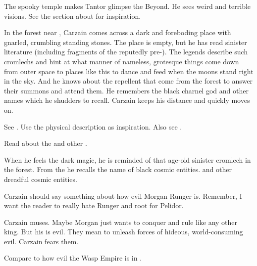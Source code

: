 \begin{changes}
    The spooky temple makes Tantor glimpse the Beyond. 
    He sees weird and terrible visions. 
    See the section about  for inspiration.
  
  
  \begin{comment}
    \paragraph{The Terror of \EreshKal}
  \end{comment}
    In the forest near \Forclin, Carzain comes across a dark and foreboding place with gnarled, crumbling standing stones.
    The place is empty, but he has read sinister literature (including fragments of the reputedly pre-\human \BathShemTorradjErebossha). 
    The legends describe such cromlechs and hint at what manner of nameless, grotesque things come down from outer space to places like this to dance and feed when the moons stand right in the sky. 
    And he knows about the repellent  that come from the forest to answer their summons and attend them. 
    He remembers the black charnel god \KhothSell and other names which he shudders to recall.
    Carzain keeps his distance and quickly moves on. 
    
    See \cite[p.366]{HPLovecraft:TheDreamQuestofUnknownKadath}. 
    Use the physical description as inspiration. 
    Also see \cite{HPLovecraft:TheStatementofRandolphCarter}. 
    
    Read about the  and other . 
    
    When he feels the dark magic, he is reminded of that age-old sinister cromlech in the forest.
    From the \BathShemTorradjErebossha he recalls the name of black cosmic entities. 
    \emph{\KhothSell{}} and other dreadful cosmic entities.
  
    Carzain should say something about how evil Morgan Runger is.
    Remember, I want the reader to really hate Runger and root for Pelidor. 
    
    Carzain muses.
    Maybe Morgan just wants to conquer and rule like any other king.
    But his \ishrah is evil. 
    They mean to unleash forces of hideous, world-consuming evil. 
    Carzain fears them. 
    
    Compare to how evil the Wasp Empire is in \cite{AdrianTchaikovsky:ShadowsoftheApt}. 
    
    
  \begin{comment}

\end{comment}
\end{changes}
